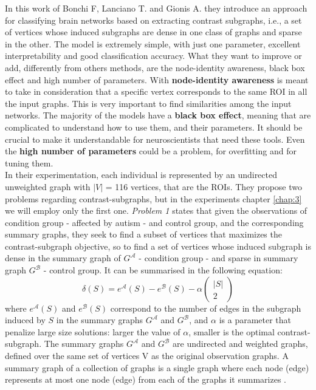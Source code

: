 In this work of Bonchi F, Lanciano T. and Gionis A. \cite{lanciano2020cs} they introduce an approach for classifying brain networks based on extracting contrast subgraphs, i.e., a set of vertices whose induced subgraphs are dense in one class of graphs and sparse in the other. The model is extremely simple, with just one parameter, excellent interpretability and good classification accuracy. What they want to improve or add, differently from others methods, are the node-identity awareness, black box effect and high number of parameters. With \textbf{node-identity awareness} is meant to take in consideration that a specific vertex corresponds to the same ROI in all the input graphs. This is very important to find similarities among the input networks. The majority of the models have a \textbf{black box effect}, meaning that are complicated to understand how to use them, and their parameters. It should be crucial to make it understandable for neuroscientists that need these tools. Even the \textbf{high number of parameters} could be a problem, for overfitting and for tuning them. 
\\

In their experimentation, each individual is represented by an undirected unweighted graph with $|V|$ = 116 vertices, that are the ROIs. They propose two problems regarding contrast-subgraphs, but in the experiments chapter \ref{chap:3} we will employ only the first one. \textit{Problem 1} states that given the observations of condition group - affected by autism - and control group, and the corresponding summary graphs, they seek to find a subset of vertices that maximizes the contrast-subgraph objective, so to find a set of vertices whose induced subgraph is dense in the summary graph of $G^{\mathcal{A}}$ - condition group - and sparse in summary graph $G^{\mathcal{B}}$ - control group. It can be summarised in the following equation:
\begin{equation}
	\delta(S)=e^{\mathcal{A}}(S)-e^{\mathcal{B}}(S)-\alpha\left(\begin{array}{c}
		|S| \\
		2
	\end{array}\right)
\end{equation}
where $ e^{\mathcal{A}}(S) $ and $ e^{\mathcal{B}}(S) $ correspond to the number of edges in the subgraph induced by $ S $ in the summary graphs $G^{\mathcal{A}}$ and $G^{\mathcal{B}}$, and $ \alpha $ is a parameter that penalize large size solutions: larger the value of $\alpha$, smaller is the optimal contrast-subgraph. The summary graphs $G^{\mathcal{A}}$ and $G^{\mathcal{B}}$ are undirected and weighted graphs, defined over the same set of vertices V as the original observation graphs. A summary graph of a collection of graphs is a single graph where each node (edge) represents at most one node (edge) from each of the graphs it summarizes \cite{6596128}.
\\

